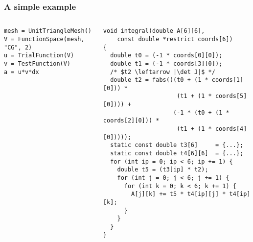\documentclass[presentation]{beamer}
\begin{document}
\begin{frame}[fragile]
  \frametitle{A simple example}
  \begin{columns}
    \begin{column}{0.5\textwidth}
\begin{verbatim}
mesh = UnitTriangleMesh()
V = FunctionSpace(mesh, "CG", 2)
u = TrialFunction(V)
v = TestFunction(V)
a = u*v*dx
\end{verbatim}
    \end{column}
\hspace{-3em}
    \begin{column}{0.65\textwidth}
\begin{verbatim}
void integral(double A[6][6], 
    const double *restrict coords[6])
{
  double t0 = (-1 * coords[0][0]);
  double t1 = (-1 * coords[3][0]);
  /* $t2 \leftarrow |\det J|$ */
  double t2 = fabs(((t0 + (1 * coords[1][0])) *
                     (t1 + (1 * coords[5][0]))) +
                    (-1 * (t0 + (1 * coords[2][0])) *
                     (t1 + (1 * coords[4][0]))));
  static const double t3[6]     = {...};
  static const double t4[6][6]  = {...};
  for (int ip = 0; ip < 6; ip += 1) {
    double t5 = (t3[ip] * t2);
    for (int j = 0; j < 6; j += 1) {
      for (int k = 0; k < 6; k += 1) {
        A[j][k] += t5 * t4[ip][j] * t4[ip][k];
      }
    }
  }
}
\end{verbatim}
    \end{column}
  \end{columns}
\end{frame}
\end{document}
